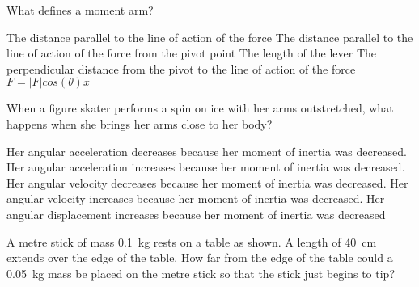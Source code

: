 \documentclass{../../oss-apphys-exam}
\begin{document}
\begin{questions}
  \classkickMCinstructions
  
  \question What defines a moment arm?
  \begin{choices}
    \choice The distance parallel to the line of action of the force
    \choice The distance parallel to the line of action of the force from the
    pivot point
    \choice The length of the lever
    \choice The perpendicular distance from the pivot to the line of action of
    the force
    \choice $F = |F|cos(\theta)x$
  \end{choices}

  \question When a figure skater performs a spin on ice with her arms
  outstretched, what happens when she brings her arms close to her body?
  \begin{choices}
    \choice Her angular acceleration decreases because her moment of inertia
    was decreased.
    \choice Her angular acceleration increases because her moment of inertia
    was decreased.
    \choice Her angular velocity decreases because her moment of inertia was
    decreased.
    \choice Her angular velocity increases because her moment of inertia was
    decreased.
    \choice Her angular displacement increases because her moment of inertia
    was decreased
  \end{choices}

\question A metre stick of mass \SI{.1}{\kilo\gram} rests on a table as
  shown. A length of \SI{40}{\centi\metre} extends over the edge of the table.
  How far from the edge of the table could a \SI{.05}{\kilo\gram} mass be
  placed on the metre stick so that the stick just begins to tip?
  \begin{center}
  \end{center}


\end{questions}
\end{document}
